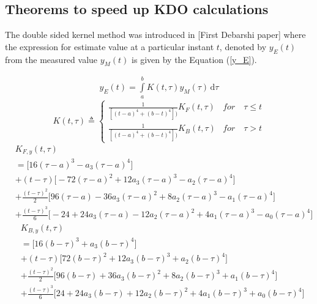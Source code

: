 \documentclass{article}
\begin{document}
\subsection{Theorems to speed up KDO calculations}

The double sided kernel method was introduced in [First Debarshi paper] where the expression for estimate value at a particular instant $t$, denoted by $y_E(t)$ from the measured value $y_M(t)$ is given by the Equation (\ref{y_E}). 

\begin{equation}
\begin{split}
y_E(t) = \int\limits_{a}^{b}K(t,\tau) y_M(\tau)\, \mathrm{d}\tau
\end{split}
\label{y_E}
\end{equation}
\begin{equation}
K(t,\tau) \triangleq \left\{
\begin{array}{lr}
\frac{1}{[(t-a)^4+(b-t)^4])} K_{F}(t,\tau) & for \quad \tau \le t\\
\frac{1}{[(t-a)^4+(b-t)^4])} K_{B}(t,\tau) & for \quad \tau > t
\end{array}
\right.
\label{K}
\end{equation}
\begin{equation}\label{Kf}
\begin{split}
	& K_{F,y}(t,\tau)\\
	&=\bigg[16(\tau-a)^{3}-a_3(\tau-a)^{4}\bigg]\\
	&+(t-\tau)\bigg[-72(\tau-a)^2 + 12a_3(\tau-a)^3 - a_2(\tau-a)^4\bigg]\\
	&+\frac{(t-\tau)^2}{2}\bigg[96(\tau-a) - 36a_3(\tau-a)^2 + 8a_2(\tau-a)^3 -a_1(\tau-a)^4\bigg]\\
	&+\frac{(t-\tau)^3}{6}\bigg[-24 + 24a_3(\tau-a) - 12a_2(\tau-a)^2 + 4a_1(\tau-a)^3 - a_0(\tau-a)^4\bigg]	
\end{split}
\end{equation}
\begin{equation}\label{eqn.73}
\begin{split}
	&K_{B,y}(t,\tau)\\
	&=\bigg[16(b-\tau)^{3} + a_3(b-\tau)^{4}\bigg]\\
	&+(t-\tau)\bigg[72(b-\tau)^{2} + 12a_3(b-\tau)^{3} + a_2(b-\tau)^{4}\bigg]\\
	&+\frac{(t-\tau)^{2}}{2}\bigg[96(b-\tau)+36a_3(b-\tau)^{2} + 8a_2(b-\tau)^{3} + a_1(b-\tau)^{4}\bigg]\\
	&+\frac{(t-\tau)^{3}}{6}\bigg[24+24a_3(b-\tau)+12a_2(b-\tau)^{2}+4a_1(b-\tau)^{3}+a_0(b-\tau)^{4}\bigg]
\end{split}
\end{equation}
\end{document}
